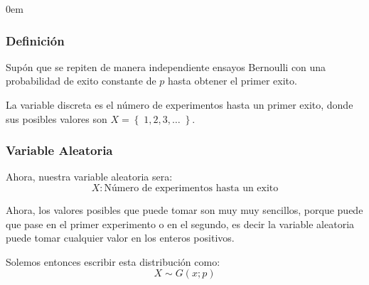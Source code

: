 \documentclass[12pt, fleqn]{report}                             %
\newenvironment{SmallIndentation}[1][0.75em]                    %
        {\begin{adjustwidth}{#1}{}\begin{footnotesize}}             %
        {\end{footnotesize}\end{adjustwidth}}                       %
\theoremstyle{break}                                            %
\newcommand{\Set}[1]            {\left\{ \; #1 \; \right\}}     %
\begin{document}
                \begin{multicols}{2}
                \begin{SmallIndentation}[0em]

                    \subsubsection{Definición}

                        Supón que se repiten de manera independiente ensayos Bernoulli
                        con una probabilidad de exito constante de $p$ hasta obtener el primer
                        exito.

                        La variable discreta es el número de experimentos hasta un primer exito,
                        donde sus posibles valores son $X = \Set{1, 2, 3, \dots}$.


                        \subsubsection{Variable Aleatoria}

                            Ahora, nuestra variable aleatoria sera:
                            \begin{equation*}
                                X : \text{Número de experimentos hasta un exito}
                            \end{equation*}

                            Ahora, los valores posibles que puede tomar son muy muy sencillos,
                            porque puede que pase en el primer experimento o en el segundo, 
                            es decir la variable aleatoria puede tomar cualquier valor en los enteros
                            positivos.

                            Solemos entonces escribir esta distribución como:
                            \begin{equation*}
                                X \sim G(x; p)
                            \end{equation*}


\end{SmallIndentation}
\end{multicols}
\end{document}
